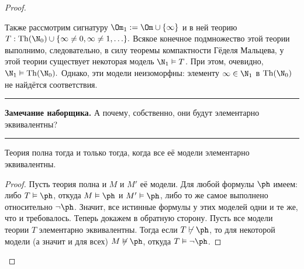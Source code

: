 \documentclass[a4paper,draft]{article}
\newenvironment{nbb}{\par\vskip3pt\hrule\vskip3pt\textbf{\footnotesize Замечание наборщика.}\footnotesize }
{\vskip3pt\hrule\par\vskip3pt}
\DeclareMathOperator{\Th}{Th}
\begin{document}
\begin{proof}
\begin{ex}
Также рассмотрим сигнатуру $\Om_1:=\Om\cup\{\infty\}$ и в ней теорию $T:\Th(\N_0)\cup\{\infty\neq0,\infty\neq1,\ldots\}.$
Всякое конечное подмножество этой теории выполнимо, следовательно, в силу теоремы компактности Гёделя Мальцева,
у этой теории существует некоторая модель $\N_1\vDash T$. При этом, очевидно, $\N_1\vDash \Th(\N_0).$
Однако, эти модели неизоморфны: элементу $\infty\in\N_1$ в $\Th(\N_0)$ не найдётся соответствия.
\end{ex}
\begin{nbb}
А почему, собственно, они будут элементарно эквивалентны?
\end{nbb}
\begin{lemma}[о полноте]
Теория полна тогда и только тогда, когда все её модели элементарно эквивалентны.
\end{lemma}
\begin{proof}
Пусть теория полна и $M$ и $M'$ её модели. Для любой формулы $\ph$ имеем: либо $T\vDash \ph$, откуда
$M\vDash\ph$ и $M'\vDash\ph$, либо то же самое выполнено относительно $\neg\ph$. Значит, все истинные формулы у этих моделей
одни и те же, что и требовалось. Теперь докажем в обратную сторону. Пусть все модели теории $T$ элементарно эквивалентны.
Тогда если $T\not\vdash\ph$, то для некоторой модели (а значит и для всех) $M\not\vDash\ph$, откуда $T\vDash\neg\ph$.
\end{proof}

\end{proof}
\end{document}
